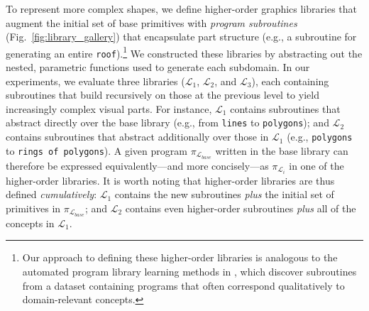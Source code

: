 \documentclass[10pt,letterpaper]{article}
\begin{document}
To represent more complex shapes, we define higher-order graphics libraries that augment the initial set of base primitives with \textit{program subroutines} (Fig.~\ref{fig:library_gallery}) that encapsulate part structure (e.g., a subroutine for generating an entire \texttt{roof}).\footnote{Our approach to defining these higher-order libraries is analogous to the automated program library learning methods in , which discover subroutines from a dataset containing programs that often correspond qualitatively to domain-relevant concepts.}
We constructed these libraries by abstracting out the nested, parametric functions used to generate each subdomain. 
In our experiments, we evaluate three libraries ($\mathcal{L}_1$, $\mathcal{L}_2$, and $\mathcal{L}_3$), each containing subroutines that build recursively on those at the previous level to yield increasingly complex visual parts.
For instance, $\mathcal{L}_1$ contains subroutines that abstract directly over the base library (e.g., from \texttt{lines} to \texttt{polygons}); and $\mathcal{L}_2$ contains subroutines that abstract additionally over those in $\mathcal{L}_1$ (e.g., \texttt{polygons} to \texttt{rings of polygons}). 
A given program $\pi_{\mathcal{L}_{base}}$ written in the base library can therefore be expressed equivalently---and more concisely---as $\pi_{\mathcal{L}_{i}}$ in one of the higher-order libraries. 
It is worth noting that higher-order libraries are thus defined \textit{cumulatively}:
$\mathcal{L}_1$ contains the new subroutines \textit{plus} the initial set of primitives in $\pi_{\mathcal{L}_{base}}$; and $\mathcal{L}_2$ contains even higher-order subroutines \textit{plus} all of the concepts in $\mathcal{L}_1$.

\end{document}
